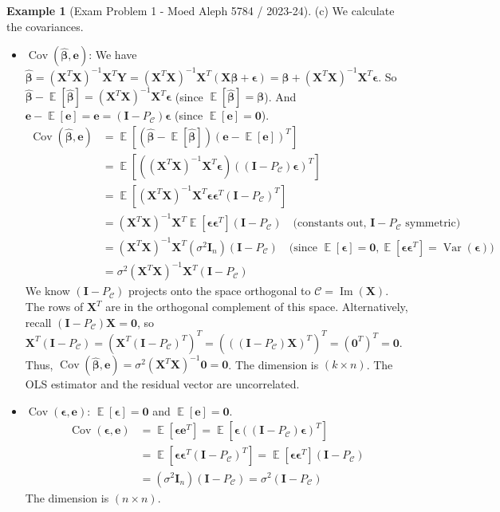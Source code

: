 \documentclass[11pt]{article}
\theoremstyle{definition}
\newtheorem{example}[theorem]{Example}
\theoremstyle{remark}
\DeclareMathOperator{\E}{\mathbb{E}}
\DeclareMathOperator{\Var}{\operatorname{Var}}
\DeclareMathOperator{\Cov}{\operatorname{Cov}}
\DeclareMathOperator{\im}{\operatorname{Im}} %
\begin{document}
\begin{example}[Exam Problem 1 - Moed Aleph 5784 / 2023-24]
(c) We calculate the covariances.
\begin{itemize}
    \item $\Cov(\hat{\bm{\beta}}, \bm{e})$:
    We have $\hat{\bm{\beta}} = (\bm{X}^T\bm{X})^{-1}\bm{X}^T\bm{Y} = (\bm{X}^T\bm{X})^{-1}\bm{X}^T(\bm{X}\bm{\beta} + \bm{\epsilon}) = \bm{\beta} + (\bm{X}^T\bm{X})^{-1}\bm{X}^T\bm{\epsilon}$.
    So $\hat{\bm{\beta}} - \E[\hat{\bm{\beta}}] = (\bm{X}^T\bm{X})^{-1}\bm{X}^T\bm{\epsilon}$ (since $\E[\hat{\bm{\beta}}]=\bm{\beta}$).
    And $\bm{e} - \E[\bm{e}] = \bm{e} = (\bm{I}-P_{\mathcal{C}})\bm{\epsilon}$ (since $\E[\bm{e}] = \mathbf{0}$).
    \begin{align*} \Cov(\hat{\bm{\beta}}, \bm{e}) &= \E[(\hat{\bm{\beta}} - \E[\hat{\bm{\beta}}]) (\bm{e} - \E[\bm{e}])^T] \\ &= \E[ ((\bm{X}^T\bm{X})^{-1}\bm{X}^T\bm{\epsilon}) ((\bm{I}-P_{\mathcal{C}})\bm{\epsilon})^T ] \\ &= \E[ (\bm{X}^T\bm{X})^{-1}\bm{X}^T\bm{\epsilon} \bm{\epsilon}^T (\bm{I}-P_{\mathcal{C}})^T ] \\ &= (\bm{X}^T\bm{X})^{-1}\bm{X}^T \E[\bm{\epsilon}\bm{\epsilon}^T] (\bm{I}-P_{\mathcal{C}}) \quad \text{(constants out, } \bm{I}-P_{\mathcal{C}} \text{ symmetric)} \\ &= (\bm{X}^T\bm{X})^{-1}\bm{X}^T (\sigma^2 \bm{I}_n) (\bm{I}-P_{\mathcal{C}}) \quad \text{(since } \E[\bm{\epsilon}]=\mathbf{0}, \E[\bm{\epsilon}\bm{\epsilon}^T]=\Var(\bm{\epsilon})) \\ &= \sigma^2 (\bm{X}^T\bm{X})^{-1}\bm{X}^T (\bm{I}-P_{\mathcal{C}}) \end{align*}
    We know $(\bm{I}-P_{\mathcal{C}})$ projects onto the space orthogonal to $\mathcal{C} = \im(\bm{X})$. The rows of $\bm{X}^T$ are in the orthogonal complement of this space. Alternatively, recall $(\bm{I}-P_{\mathcal{C}})\bm{X} = \mathbf{0}$, so $\bm{X}^T(\bm{I}-P_{\mathcal{C}}) = (\bm{X}^T(\bm{I}-P_{\mathcal{C}})^T)^T = ( ((\bm{I}-P_{\mathcal{C}})\bm{X})^T )^T = (\mathbf{0}^T)^T = \mathbf{0}$.
    Thus, $\Cov(\hat{\bm{\beta}}, \bm{e}) = \sigma^2 (\bm{X}^T\bm{X})^{-1} \mathbf{0} = \mathbf{0}$.
    The dimension is $(k \times n)$. The OLS estimator and the residual vector are uncorrelated.

    \item $\Cov(\bm{\epsilon}, \bm{e})$:
    $\E[\bm{\epsilon}]=\mathbf{0}$ and $\E[\bm{e}]=\mathbf{0}$.
    \begin{align*} \Cov(\bm{\epsilon}, \bm{e}) &= \E[\bm{\epsilon}\bm{e}^T] = \E[\bm{\epsilon} ((\bm{I}-P_{\mathcal{C}})\bm{\epsilon})^T] \\ &= \E[\bm{\epsilon}\bm{\epsilon}^T(\bm{I}-P_{\mathcal{C}})^T] = \E[\bm{\epsilon}\bm{\epsilon}^T](\bm{I}-P_{\mathcal{C}}) \\ &= (\sigma^2 \bm{I}_n)(\bm{I}-P_{\mathcal{C}}) = \sigma^2 (\bm{I}-P_{\mathcal{C}}) \end{align*}
    The dimension is $(n \times n)$.


\end{itemize}
\end{example}
\end{document}
